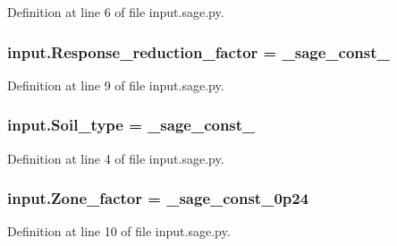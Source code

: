 Definition at line 6 of file input.\+sage.\+py.

\hypertarget{a00038_aa6d0078a6d934c0d515d85059525e938}{}
\subsubsection[{Response\+\_\+reduction\+\_\+factor}]{\setlength{\rightskip}{0pt plus 5cm}input.\+Response\+\_\+reduction\+\_\+factor = \+\_\+sage\+\_\+const\+\_}\label{a00038_aa6d0078a6d934c0d515d85059525e938}


Definition at line 9 of file input.\+sage.\+py.

\hypertarget{a00038_a6221ae01cf2fb9e8cd22204749785a0e}{}
\subsubsection[{Soil\+\_\+type}]{\setlength{\rightskip}{0pt plus 5cm}input.\+Soil\+\_\+type = \+\_\+sage\+\_\+const\+\_}\label{a00038_a6221ae01cf2fb9e8cd22204749785a0e}


Definition at line 4 of file input.\+sage.\+py.

\hypertarget{a00038_aeea70e58ec9bb0d3d6c4363867eb0f82}{}
\subsubsection[{Zone\+\_\+factor}]{\setlength{\rightskip}{0pt plus 5cm}input.\+Zone\+\_\+factor = \+\_\+sage\+\_\+const\+\_\+0p24}\label{a00038_aeea70e58ec9bb0d3d6c4363867eb0f82}


Definition at line 10 of file input.\+sage.\+py.

